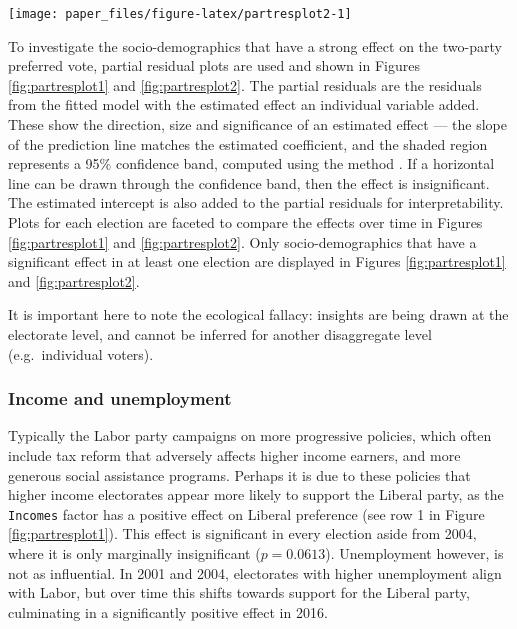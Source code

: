 \documentclass[times, doublespace]{anzsauth}
\let\origfigure\figure
\let\endorigfigure\endfigure
\renewenvironment{figure}[1][2] {
    \expandafter\origfigure\expandafter[htbp]
} {
    \endorigfigure
}
\begin{document}
\begin{figure}[h]

{\centering \texttt{[image: paper\_files/figure-latex/partresplot2-1]} 

}

\caption{Partial residual plots by election year for a selection of predictors. Linear model with 95\% confidence bands overlaid. Several predictors have a negative relationship: with larger values indicating the electorate more likely preferences Labor. Most relationships are relatively stable over elections, except OtherLanguage and Education.}\label{fig:partresplot2}
\end{figure}

To investigate the socio-demographics that have a strong effect on the two-party preferred vote, partial residual plots are used and shown in Figures \ref{fig:partresplot1} and \ref{fig:partresplot2}. The partial residuals are the residuals from the fitted model with the estimated effect an individual variable added. These show the direction, size and significance of an estimated effect --- the slope of the prediction line matches the estimated coefficient, and the shaded region represents a 95\% confidence band, computed using the method \citet{visreg}. If a horizontal line can be drawn through the confidence band, then the effect is insignificant. The estimated intercept is also added to the partial residuals for interpretability. Plots for each election are faceted to compare the effects over time in Figures \ref{fig:partresplot1} and \ref{fig:partresplot2}. Only socio-demographics that have a significant effect in at least one election are displayed in Figures \ref{fig:partresplot1} and \ref{fig:partresplot2}.

It is important here to note the ecological fallacy: insights are being drawn at the electorate level, and cannot be inferred for another disaggregate level (e.g.~individual voters).

\hypertarget{income-and-unemployment}{%
\subsubsection*{Income and unemployment}\label{income-and-unemployment}}

Typically the Labor party campaigns on more progressive policies, which often include tax reform that adversely affects higher income earners, and more generous social assistance programs. Perhaps it is due to these policies that higher income electorates appear more likely to support the Liberal party, as the \texttt{Incomes} factor has a positive effect on Liberal preference (see row 1 in Figure \ref{fig:partresplot1}). This effect is significant in every election aside from 2004, where it is only marginally insignificant (\(p = 0.0613\)). Unemployment however, is not as influential. In 2001 and 2004, electorates with higher unemployment align with Labor, but over time this shifts towards support for the Liberal party, culminating in a significantly positive effect in 2016.
\end{document}
